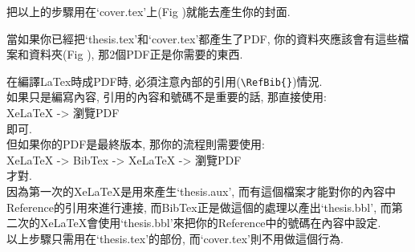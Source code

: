 \newpage
把以上的步驟用在`cover.tex'上(Fig )就能去產生你的封面.


當如果你已經把`thesis.tex'和`cover.tex'都產生了PDF, 你的資料夾應該會有這些檔案和資料夾(Fig ), 那2個PDF正是你需要的東西.



\newpage
{}

在編譯LaTex時成PDF時, 必須注意內部的引用(\verb|\RefBib{}|)情況.\\

如果只是編寫內容, 引用的內容和號碼不是重要的話, 那直接使用:\\
XeLaTeX -> 瀏覽PDF\\
即可.\\

但如果你的PDF是最終版本, 那你的流程則需要使用:\\
XeLaTeX -> BibTex -> XeLaTeX -> 瀏覽PDF\\
才對.\\

因為第一次的XeLaTeX是用來產生`thesis.aux', 而有這個檔案才能對你的內容中Reference的引用來進行連接, 而BibTex正是做這個的處理以產出`thesis.bbl', 而第二次的XeLaTeX會使用`thesis.bbl'來把你的Reference中的號碼在內容中設定.\\

以上步驟只需用在`thesis.tex'的部份, 而`cover.tex'則不用做這個行為.

